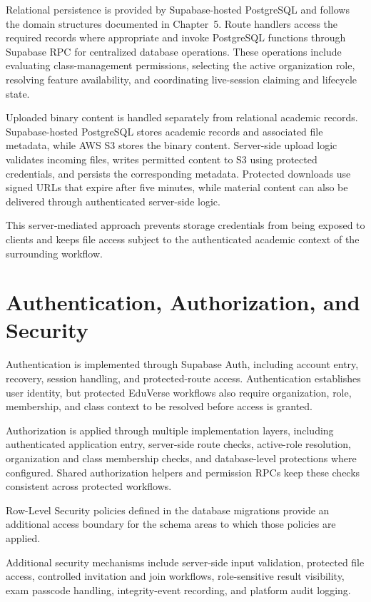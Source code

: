Relational persistence is provided by Supabase-hosted PostgreSQL and follows the
domain structures documented in Chapter~5. Route handlers access the required
records where appropriate and invoke PostgreSQL functions through Supabase RPC
for centralized database operations. These operations include evaluating
class-management permissions, selecting the active organization role,
resolving feature availability, and coordinating live-session claiming and
lifecycle state.

Uploaded binary content is handled separately from relational academic
records. Supabase-hosted PostgreSQL stores academic records and associated file
metadata, while AWS S3 stores the binary content. Server-side upload logic
validates incoming files, writes permitted content to S3 using protected
credentials, and persists the corresponding metadata. Protected downloads use
signed URLs that expire after five minutes, while material content can also be
delivered through authenticated server-side logic.

This server-mediated approach prevents storage credentials from being exposed
to clients and keeps file access subject to the authenticated academic context
of the surrounding workflow.

\section{Authentication, Authorization, and Security}
\label{sec:authentication_authorization_security}

Authentication is implemented through Supabase Auth, including account entry,
recovery, session handling, and protected-route access. Authentication
establishes user identity, but protected EduVerse workflows also require
organization, role, membership, and class context to be resolved before access
is granted.

Authorization is applied through multiple implementation layers, including
authenticated application entry, server-side route checks, active-role
resolution, organization and class membership checks, and database-level
protections where configured. Shared authorization helpers and permission RPCs
keep these checks consistent across protected workflows.

Row-Level Security policies defined in the database migrations provide an
additional access boundary for the schema areas to which those policies are
applied.

Additional security mechanisms include server-side input validation, protected
file access, controlled invitation and join workflows, role-sensitive result
visibility, exam passcode handling, integrity-event recording, and platform
audit logging.

